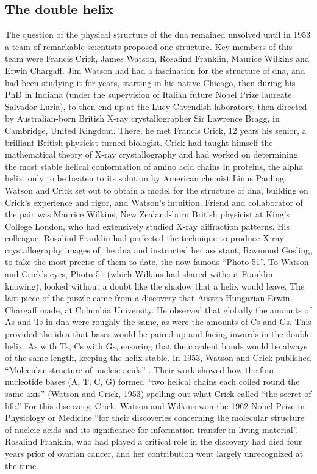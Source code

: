 \subsection{The double helix} %

The question of the physical structure of the \gls{dna} remained unsolved until in 1953 a team of remarkable scientists proposed one structure. 
Key members of this team were Francis Crick, James Watson, Rosalind Franklin, Maurice Wilkins and Erwin Chargaff. 
Jim Watson had had a fascination for the structure of \gls{dna}, and had been studying it for years, starting in his native Chicago, then during his PhD in Indiana (under the supervision of Italian future Nobel Prize laureate Salvador Luria), to then end up at the Lucy Cavendish laboratory, then directed by Australian-born British X-ray crystallographer Sir Lawrence Bragg, in Cambridge, United Kingdom. 
There, he met Francis Crick, 12 years his senior, a brilliant British physicist turned biologist. 
Crick had taught himself the mathematical theory of X-ray crystallography and had worked on determining the most stable helical conformation of amino acid chains in proteins, the alpha helix, only to be beaten to its solution by American chemist Linus Pauling. 
Watson and Crick set out to obtain a model for the structure of \gls{dna}, building on Crick’s experience and rigor, and Watson’s intuition. 
Friend and collaborator of the pair was Maurice Wilkins, New Zealand-born British physicist at King’s College London, who had extensively studied X-ray diffraction patterns. 
His colleague, Rosalind Franklin had perfected the technique to produce X-ray crystallography images of the \gls{dna} and instructed her assistant, Raymond Gosling, to take the most precise of them to date, the now famous “Photo 51”. 
To Watson and Crick’s eyes, Photo 51 (which Wilkins had shared without Franklin knowing), looked without a doubt like the shadow that a helix would leave. The last piece of the puzzle came from a discovery that Austro-Hungarian Erwin Chargaff made, at Columbia University. He observed that globally the amounts of As and Ts in \gls{dna} were roughly the same, as were the amounts of Cs and Gs. 
This provided the idea that bases would be paired up and facing inwards in the double helix, As with Ts, Cs with Gs, ensuring that the covalent bonds would be always of the same length, keeping the helix stable. 
In 1953, Watson and Crick published “Molecular structure of nucleic acids” \cite{watson1953molecular}. 
Their work showed how the four nucleotide bases (A, T, C, G) formed “two helical chains each coiled round the same axis” (Watson and Crick, 1953) spelling out what Crick called “the secret of life.” 
For this discovery, Crick, Watson and Wilkins won the 1962 Nobel Prize in Physiology or Medicine “for their discoveries concerning the molecular structure of nucleic acids and its significance for information transfer in living material”. 
Rosalind Franklin, who had played a critical role in the discovery had died four years prior of ovarian cancer, and her contribution went largely unrecognized at the time.


